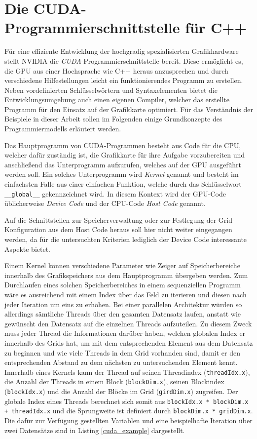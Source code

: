 \section{Die CUDA-Programmierschnittstelle für C++}

Für eine effiziente Entwicklung der hochgradig spezialisierten Grafikhardware stellt \mbox{NVIDIA} die \emph{CUDA}-Programmierschnittstelle bereit.
Diese ermöglicht es, die GPU aus einer Hochsprache wie C++ heraus anzusprechen und durch verschiedene Hilfestellungen leicht ein funktionierendes Programm zu erstellen.
Neben vordefinierten Schlüsselwörtern und Syntaxelementen bietet die Entwicklungsumgebung auch einen eigenen Compiler, welcher das erstellte Programm für den Einsatz auf der Grafikkarte optimiert.
Für das Verständnis der Beispiele in dieser Arbeit sollen im Folgenden einige Grundkonzepte des Programmiermodells erläutert werden.

Das Hauptprogramm von CUDA-Programmen besteht aus Code für die CPU, welcher dafür zuständig ist, die Grafikkarte für ihre Aufgabe vorzubereiten und anschließend das Unterprogramm aufzurufen, welches auf der GPU ausgeführt werden soll.
Ein solches Unterprogramm wird \emph{Kernel} genannt und besteht im einfachsten Falle aus einer einfachen Funktion, welche durch das Schlüsselwort \texttt{\_\_global\_\_} gekennzeichnet wird.
In diesem Kontext wird der GPU-Code üblicherweise \emph{Device Code} und der CPU-Code \emph{Host Code} genannt.

Auf die Schnittstellen zur Speicherverwaltung oder zur Festlegung der Grid-Konfiguration aus dem Host Code heraus soll hier nicht weiter eingegangen werden, da für die untersuchten Kriterien lediglich der Device Code interessante Aspekte bietet.

Einem Kernel können verschiedene Parameter wie Zeiger auf Speicherbereiche innerhalb des Grafikspeichers aus dem Hauptprogramm übergeben werden.
Zum Durchlaufen eines solchen Speicherbereiches in einem sequenziellen Programm wäre es ausreichend mit einem Index über das Feld zu iterieren und diesen nach jeder Iteration um eins zu erhöhen.
Bei einer parallelen Architektur würden so allerdings sämtliche Threads über den gesamten Datensatz laufen, anstatt wie gewünscht den Datensatz auf die einzelnen Threads aufzuteilen.
Zu diesem Zweck muss jeder Thread die Informationen darüber haben, welchen globalen Index er innerhalb des Grids hat, um mit dem entsprechenden Element aus dem Datensatz zu beginnen und wie viele Threads in dem Grid vorhanden sind, damit er den entsprechenden Abstand zu dem nächsten zu untersuchenden Element kennt.
Innerhalb eines Kernels kann der Thread auf seinen Threadindex (\texttt{threadIdx.x}), die Anzahl der Threads in einem Block (\texttt{blockDim.x}), seinen Blockindex (\texttt{blockIdx.x}) und die Anzahl der Blöcke im Grid (\texttt{girdDim.x}) zugreifen.
Der globale Index eines Threads berechnet sich somit aus \texttt{blockIdx.x * blockDim.x + threadIdx.x} und die Sprungweite ist definiert durch \texttt{blockDim.x * gridDim.x}.
Die dafür zur Verfügung gestellten Variablen und eine beispielhafte Iteration über zwei Datensätze sind in Listing \ref{cuda_example} dargestellt.

